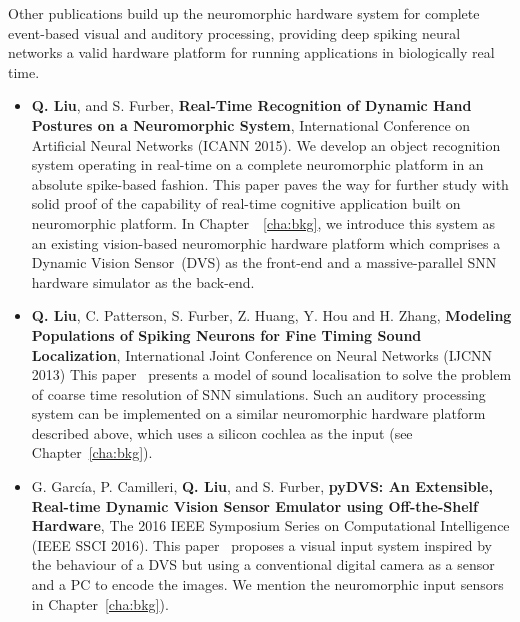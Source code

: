 	Other publications build up the neuromorphic hardware system for complete event-based visual and auditory processing, providing deep spiking neural networks a valid hardware platform for running applications in biologically real time.
\begin{itemize}
	\item 
	\textbf{Q. Liu}, and S. Furber, \textbf{Real-Time Recognition of Dynamic Hand Postures on a Neuromorphic System}, International Conference on Artificial Neural Networks (ICANN 2015).
	We develop an object recognition system operating in real-time on a complete neuromorphic platform in an absolute spike-based fashion.
	This paper paves the way for further study with solid proof of the capability of real-time cognitive application built on neuromorphic platform.
	In Chapter~~\ref{cha:bkg}, we introduce this system as an existing vision-based neuromorphic hardware platform which comprises a Dynamic Vision Sensor~(DVS) as the front-end and a massive-parallel SNN hardware simulator as the back-end. 
	
	\item
	\textbf{Q. Liu}, C. Patterson, S. Furber, Z. Huang, Y. Hou and H. Zhang, \textbf{Modeling Populations of Spiking Neurons for Fine Timing Sound Localization}, International Joint Conference on Neural Networks (IJCNN 2013)
	This paper~\citep{liu2013modeling} presents a model of sound localisation to solve the problem of coarse time resolution of SNN simulations.
	Such an auditory processing system can be implemented on a similar neuromorphic hardware platform described above, which uses a silicon cochlea as the input (see Chapter~\ref{cha:bkg}).
	
	\item 
	G. Garc\'ia, P. Camilleri, \textbf{Q. Liu}, and S. Furber, \textbf{pyDVS: An Extensible, Real-time Dynamic Vision Sensor Emulator using Off-the-Shelf Hardware}, The 2016 IEEE Symposium Series on Computational Intelligence (IEEE SSCI 2016).
	This paper~\citep{7850249} proposes a visual input system inspired by the behaviour of a DVS but using a conventional digital camera as a sensor and a
	PC to encode the images.
	We mention the neuromorphic input sensors in Chapter~\ref{cha:bkg}).
\end{itemize}


